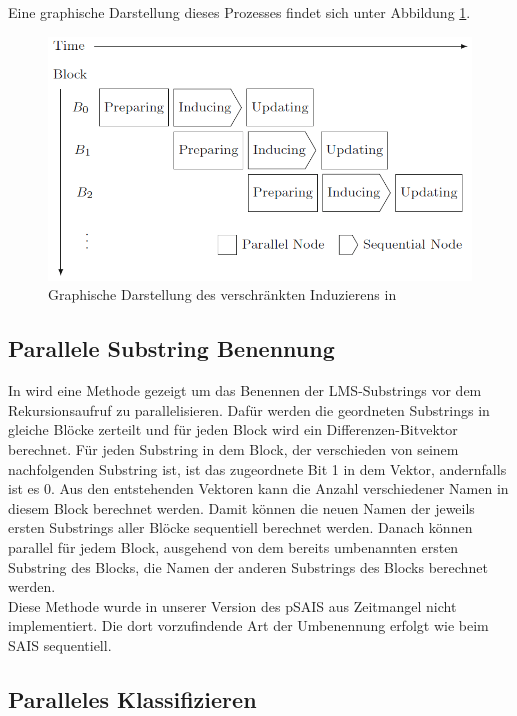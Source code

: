 Eine graphische Darstellung dieses Prozesses findet sich unter Abbildung \ref{psaisArch}.

\begin{figure}
\includegraphics[width=\textwidth]{kapitel/saca_algorithmen/psais/psais_architecture.png}
\caption{Graphische Darstellung des verschränkten Induzierens in \cite{psais}}
\label{psaisArch}
\end{figure}


\subsection{Parallele Substring Benennung}

In \cite{psais} wird eine Methode gezeigt um das Benennen der LMS-Substrings vor dem Rekursionsaufruf zu parallelisieren. Dafür werden die geordneten Substrings in gleiche Blöcke zerteilt und für jeden Block wird ein Differenzen-Bitvektor berechnet. Für jeden Substring in dem Block, der verschieden von seinem nachfolgenden Substring ist, ist das zugeordnete Bit 1 in dem Vektor, andernfalls ist es 0. Aus den entstehenden Vektoren kann die Anzahl verschiedener Namen in diesem Block berechnet werden. Damit können die neuen Namen der jeweils ersten Substrings aller Blöcke sequentiell berechnet werden. Danach können parallel für jedem Block, ausgehend von dem bereits umbenannten ersten Substring des Blocks, die Namen der anderen Substrings des Blocks berechnet werden. \\

Diese Methode wurde in unserer Version des pSAIS aus Zeitmangel nicht implementiert. Die dort vorzufindende Art der Umbenennung erfolgt wie beim SAIS sequentiell.

\subsection{Paralleles Klassifizieren}
\label{subsection:psais_classifying}


